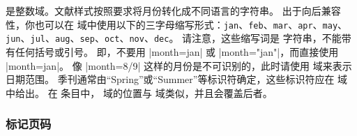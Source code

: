 
 是整数域。文献样式按照要求将月份转化成不同语言的字符串。
出于向后兼容性，你也可以在  域中使用以下的三字母缩写形式：\texttt{jan}、\texttt{feb}、\texttt{mar}、\texttt{apr}、\texttt{may}、\texttt{jun}、\texttt{jul}、\texttt{aug}、\texttt{sep}、\texttt{oct}、\texttt{nov}、\texttt{dec}。
请注意，这些缩写词是 \BibTeX 字符串，不能带有任何括号或引号。
即，不要用 |month={jan}| 或 |month="jan"|，而直接使用 |month=jan|。
像 |month={8/9}| 这样的月份是不可识别的，此时请使用  域来表示日期范围。
季刊通常由“Spring”或“Summer”等标识符确定，这些标识符应在  域中给出。
在  条目中， 域的位置与  域类似，并且会覆盖后者。

\subsubsection{标记页码}%
\label{bib:use:pag}


